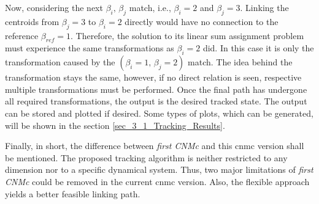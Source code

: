 Now, considering the next $\beta_{i},\, \beta_j$ match, i.e., $\beta_i = 2$ and $\beta_j = 3$. 
Linking the centroids from $\beta_j = 3$ to $\beta_i = 2$ directly would have no connection to the reference $\beta_{ref} = 1$. 
Therefore, the solution to its linear sum assignment problem must experience the same transformations as $\beta_i = 2$ did. 
In this case it is only the transformation caused by the $(\beta_i = 1,\,\beta_j = 2)$ match.
The idea behind the transformation stays the same, however, if no direct relation is seen, respective multiple transformations must be performed.
Once the final path has undergone all required transformations, the output is the desired tracked state. 
The output can be stored and plotted if desired. 
Some types of plots, which can be generated, will be shown in the section 
\ref{sec_3_1_Tracking_Results}.\newline

Finally, in short, the difference between \emph{first CNMc} and this \gls{cnmc} version shall be mentioned. 
The proposed tracking algorithm is neither restricted to any dimension nor to a specific dynamical system. Thus, two major limitations of \emph{first CNMc} could be removed in the current \gls{cnmc} version. 
Also, the flexible approach yields a better feasible linking path. 

